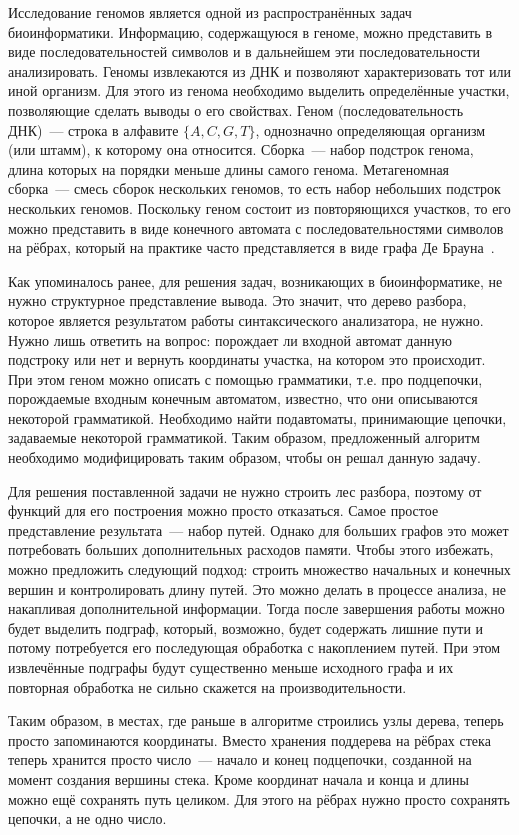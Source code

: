 Исследование геномов является одной из распространённых задач биоинформатики. Информацию, содержащуюся в геноме, можно представить в виде последовательностей символов и в дальнейшем эти последовательности анализировать. Геномы извлекаются из ДНК и позволяют характеризовать тот или иной организм. Для этого из генома необходимо выделить определённые участки, позволяющие сделать выводы о его свойствах. Геном (последовательность ДНК)~--- строка в алфавите $\{A, C, G, T\}$, однозначно определяющая организм (или штамм), к которому она относится. Сборка~--- набор подстрок генома, длина которых на порядки меньше длины самого генома. Метагеномная сборка~--- смесь сборок нескольких геномов, то есть набор небольших подстрок нескольких геномов. Поскольку геном состоит из повторяющихся участков, то его можно представить в виде конечного автомата с последовательностями символов на рёбрах, который на практике часто представляется в виде графа  Де Брауна~\cite{Bruijn}.

Как упоминалось ранее, для решения задач, возникающих в биоинформатике, не нужно структурное представление вывода. Это значит, что дерево разбора, которое является результатом работы синтаксического анализатора, не нужно. Нужно лишь ответить на вопрос: порождает ли входной автомат данную подстроку или нет и вернуть координаты участка, на котором это происходит. При этом геном можно описать с помощью грамматики, т.е. про подцепочки, порождаемые входным конечным автоматом, известно, что они описываются некоторой грамматикой. Необходимо найти подавтоматы, принимающие цепочки, задаваемые некоторой грамматикой. Таким образом, предложенный алгоритм необходимо модифицировать таким образом, чтобы он решал данную задачу. 

Для решения поставленной задачи не нужно строить лес разбора, поэтому от функций для его построения можно просто отказаться. Самое простое представление результата~--- набор путей. Однако для больших графов это может потребовать больших дополнительных расходов памяти. Чтобы этого избежать, можно предложить следующий подход: строить множество начальных и конечных вершин и контролировать длину путей. Это можно делать в процессе анализа, не накапливая дополнительной информации. Тогда после завершения работы можно будет выделить подграф, который, возможно, будет содержать лишние пути и потому потребуется его последующая обработка с накоплением путей. При этом извлечённые подграфы будут существенно меньше исходного графа и их повторная обработка не сильно скажется на производительности.

Таким образом, в местах, где раньше в алгоритме строились узлы дерева, теперь просто запоминаются координаты. Вместо хранения поддерева на рёбрах стека теперь хранится просто число~--- начало и конец подцепочки, созданной на момент создания вершины стека. Кроме координат начала и конца и длины можно ещё сохранять путь целиком. Для этого на рёбрах нужно просто сохранять цепочки, а не одно число. 
